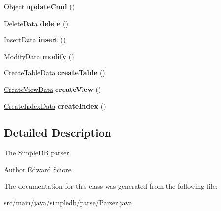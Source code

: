 \begin{DoxyCompactItemize}
\mbox{\label{classsimpledb_1_1parse_1_1Parser_a61be1eab9bb4c2010a3372555044e554}} 
Object {\bfseries update\+Cmd} ()
\item 
\mbox{\label{classsimpledb_1_1parse_1_1Parser_a343852689668183a51b6ce4399215767}} 
\hyperlink{classsimpledb_1_1parse_1_1DeleteData}{Delete\+Data} {\bfseries delete} ()
\item 
\mbox{\label{classsimpledb_1_1parse_1_1Parser_a0494405bb25182199e7d126a48096e64}} 
\hyperlink{classsimpledb_1_1parse_1_1InsertData}{Insert\+Data} {\bfseries insert} ()
\item 
\mbox{\label{classsimpledb_1_1parse_1_1Parser_ad302bd1823dfc8bc266b709cfe7e5a2b}} 
\hyperlink{classsimpledb_1_1parse_1_1ModifyData}{Modify\+Data} {\bfseries modify} ()
\item 
\mbox{\label{classsimpledb_1_1parse_1_1Parser_a2e8ca678d78645140c37fb5eaae84482}} 
\hyperlink{classsimpledb_1_1parse_1_1CreateTableData}{Create\+Table\+Data} {\bfseries create\+Table} ()
\item 
\mbox{\label{classsimpledb_1_1parse_1_1Parser_afe11900ca0cc8e631372c8af111ea5f8}} 
\hyperlink{classsimpledb_1_1parse_1_1CreateViewData}{Create\+View\+Data} {\bfseries create\+View} ()
\item 
\mbox{\label{classsimpledb_1_1parse_1_1Parser_ac4b3a17d1233a65b42fb8cf401286176}} 
\hyperlink{classsimpledb_1_1parse_1_1CreateIndexData}{Create\+Index\+Data} {\bfseries create\+Index} ()
\end{DoxyCompactItemize}


\subsection{Detailed Description}
The Simple\+DB parser. \begin{DoxyAuthor}{Author}
Edward Sciore 
\end{DoxyAuthor}


The documentation for this class was generated from the following file\+:\begin{DoxyCompactItemize}
\item 
src/main/java/simpledb/parse/Parser.\+java\end{DoxyCompactItemize}
